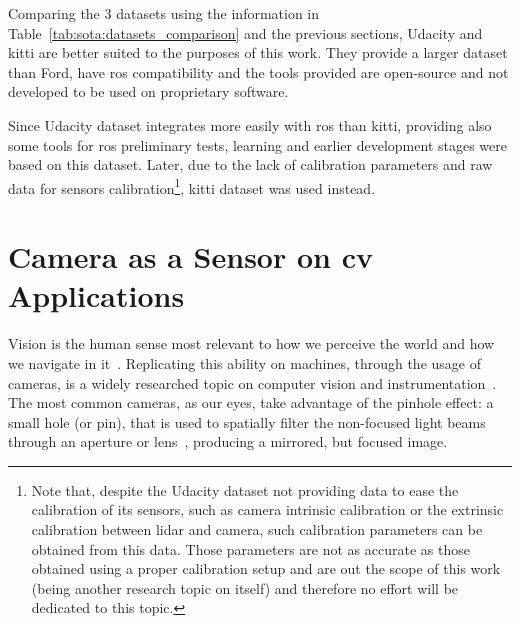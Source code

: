 \addtocounter{footnote}{-1}
\addtocounter{footnote}{1}

Comparing the 3 datasets using the information in Table~\ref{tab:sota:datasets_comparison} and the previous sections, Udacity and \ac{kitti} are better suited to the purposes of this work. They provide a larger dataset than Ford, have \ac{ros} compatibility and the tools provided are open-source and not developed to be used on proprietary software.

Since Udacity dataset integrates more easily with \ac{ros} than \ac{kitti}, providing also some tools for \ac{ros} preliminary tests, learning and earlier development stages were based on this dataset. Later, due to the lack of calibration parameters and raw data for sensors calibration\footnote{Note that, despite the Udacity dataset not providing data to ease the calibration of its sensors, such as camera intrinsic calibration or the extrinsic calibration between \ac{lidar} and camera, such calibration parameters can be obtained from this data. Those parameters are not as accurate as those obtained using a proper calibration setup and are out the scope of this work (being another research topic on itself) and therefore no effort will be dedicated to this topic.}, \ac{kitti} dataset was used instead.



\section{Camera as a Sensor on \acl{cv} Applications}
\label{sec:sota:camera}
Vision is the human sense most relevant to how we perceive the world and how we navigate in it~\cite{Ekstrom2015, Beck1983}. Replicating this ability on machines, through the usage of cameras, is a widely researched topic on computer vision and instrumentation~\cite{Beck1983}. The most common cameras, as our eyes, take advantage of the pinhole effect: a small hole (or pin), that is used to spatially filter the non-focused light beams through an aperture or lens~\cite{Beck1983, camera_models, Sturm2010}, producing a mirrored, but focused image.

